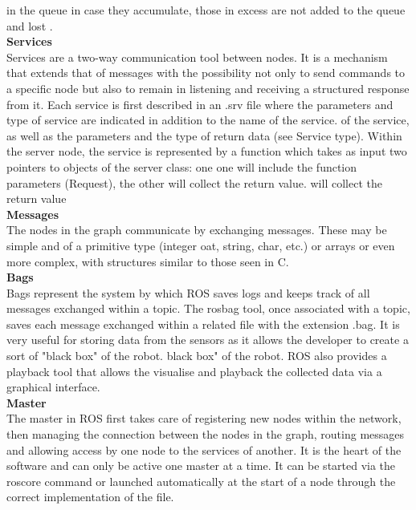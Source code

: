 in the queue in case they accumulate, those in excess are not added to the queue and lost \citet{rostopics}.\\
\newline
\textbf{Services}\\
Services are a two-way communication tool between nodes. It is a mechanism that extends that of messages with the possibility
not only to send commands to a specific node but also to remain in
listening and receiving a structured response from it. Each service is
first described in an .srv file where the parameters and type of service are indicated in addition to the name of the service.
of the service, as well as the parameters and the type of return data (see Service type).
Within the server node, the service is represented by a function
which takes as input two pointers to objects of the server class: one
one will include the function parameters (Request), the other will collect the return value.
will collect the return value \citet{rosservice}\\
\newline
\textbf{Messages}\\
The nodes in the graph communicate by exchanging messages. These
may be simple and of a primitive type (integer 
oat, string, char, etc.)
or arrays or even more complex, with structures similar to those seen in
C.\\
\newline
\textbf{Bags}\\
Bags represent the system by which ROS saves logs and keeps track of
all messages exchanged within a topic. The rosbag tool, once
associated with a topic, saves each message exchanged within a related file with the extension .bag. It is
very useful for storing data from the
sensors as it allows the developer to create a sort of "black box" of the robot.
black box" of the robot. ROS also provides a playback tool that allows the
visualise and playback the collected data via a graphical interface.\\
\newpage
\textbf{Master}\\
The master in ROS first takes care of registering new nodes within the
network, then managing the connection between the nodes in the graph, routing
messages and allowing access by one node to the services of another.
It is the heart of the software and can only be active one master at a time. It can be started via the roscore command or launched automatically
at the start of a node through the correct implementation of the file.
